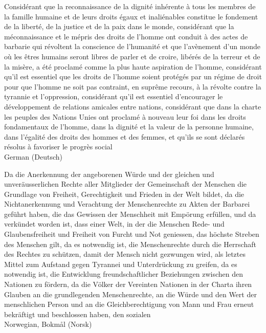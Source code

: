 \documentclass[12pt]{article}
\begin{document}
Considérant que la reconnaissance de la dignité inhérente à tous les membres de la famille humaine et de leurs droits égaux et inaliénables constitue le fondement de la liberté, de la justice et de la paix dans le monde, considérant que la méconnaissance et le mépris des droits de l’homme ont conduit à des actes de barbarie qui révoltent la conscience de l’humanité et que l’avènement d’un monde où les êtres humains seront libres de parler et de croire, libérés de la terreur et de la misère, a été proclamé comme la plus haute aspiration de l’homme, considérant qu’il est essentiel que les droits de l’homme soient protégés par un régime de droit pour que l’homme ne soit pas contraint, en suprême recours, à la révolte contre la tyrannie et l’oppression, considérant qu’il est essentiel d’encourager le développement de relations amicales entre nations, considérant que dans la charte les peuples des Nations Unies ont proclamé à nouveau leur foi dans les droits fondamentaux de l’homme, dans la dignité et la valeur de la personne humaine, dans l’égalité des droits des hommes et des femmes, et qu’ils se sont déclarés résolus à favoriser le progrès social\\

German (Deutsch) 

Da die Anerkennung der angeborenen Würde und der gleichen und unveräusserlichen Rechte aller Mitglieder der Gemeinschaft der Menschen die Grundlage von Freiheit, Gerechtigkeit und Frieden in der Welt bildet, da die Nichtanerkennung und Verachtung der Menschenrechte zu Akten der Barbarei geführt haben, die das Gewissen der Menschheit mit Empörung erfüllen, und da verkündet worden ist, dass einer Welt, in der die Menschen Rede- und Glaubensfreiheit und Freiheit von Furcht und Not geniessen, das höchste Streben des Menschen gilt, da es not\-wen\-dig ist, die Menschenrechte durch die Herrschaft des Rechtes zu schützen, da\-mit der Mensch nicht gezwungen wird, als letztes Mittel zum Aufstand gegen Ty\-ran\-nei und Unterdrückung zu greifen, da es notwendig ist, die Entwicklung freund\-schaftlicher Beziehungen zwischen den Nationen zu fördern, da die Völker der Vereinten Nationen in der Charta ihren Glauben an die grundlegenden Menschenrechte, an die Würde und den Wert der menschlichen Person und an die Gleichberechtigung von Mann und Frau erneut bekräftigt und beschlossen haben, den sozialen\\

Norwegian, Bokmål (Norsk)
\end{document}
